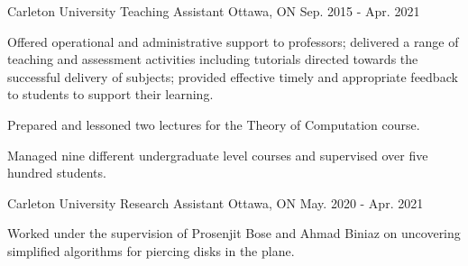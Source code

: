 \begin{cventries}
\cventry
{Carleton University}
{Teaching Assistant}
{Ottawa, ON}
{Sep. 2015 - Apr. 2021}
{\begin{cvitems}
    \item {Offered operational and administrative support to professors; delivered a range of teaching and assessment activities including tutorials directed towards the successful delivery of subjects; provided effective timely and appropriate feedback to students to support their learning.}
    \item {Prepared and lessoned two lectures for the Theory of Computation course.}
    \item {Managed nine different undergraduate level courses and supervised over five hundred students.}
\end{cvitems}}

\cventry
{Carleton University}
{Research Assistant}
{Ottawa, ON}
{May. 2020 - Apr. 2021}
{\begin{cvitems}
    \item {Worked under the supervision of Prosenjit Bose and Ahmad Biniaz on uncovering simplified algorithms for piercing disks in the plane.}
\end{cvitems}}

\end{cventries}
